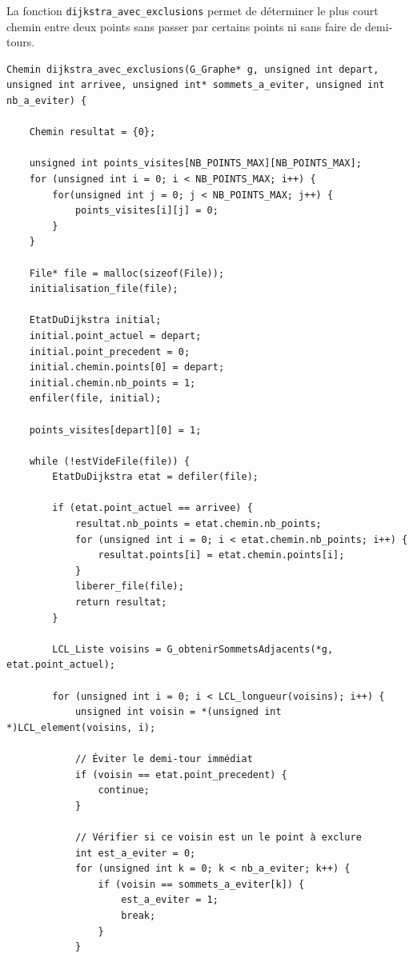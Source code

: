 \documentclass[11pt,a4paper]{article}
\begin{document}
La fonction \texttt{dijkstra\_avec\_exclusions} permet de déterminer le plus court chemin entre deux points sans passer par certains points ni sans faire de demi-tours.

\begin{lstlisting}[caption={Fonction dijkstra avec exclusions}, label=lst:dijkstra]
Chemin dijkstra_avec_exclusions(G_Graphe* g, unsigned int depart, unsigned int arrivee, unsigned int* sommets_a_eviter, unsigned int nb_a_eviter) {
    
    Chemin resultat = {0};
    
    unsigned int points_visites[NB_POINTS_MAX][NB_POINTS_MAX];
    for (unsigned int i = 0; i < NB_POINTS_MAX; i++) {
        for(unsigned int j = 0; j < NB_POINTS_MAX; j++) {
            points_visites[i][j] = 0;
        }
    }

    File* file = malloc(sizeof(File));
    initialisation_file(file);

    EtatDuDijkstra initial;
    initial.point_actuel = depart;
    initial.point_precedent = 0;
    initial.chemin.points[0] = depart;
    initial.chemin.nb_points = 1;
    enfiler(file, initial);
    
    points_visites[depart][0] = 1;

    while (!estVideFile(file)) {
        EtatDuDijkstra etat = defiler(file);
        
        if (etat.point_actuel == arrivee) {
            resultat.nb_points = etat.chemin.nb_points;
            for (unsigned int i = 0; i < etat.chemin.nb_points; i++) {
                resultat.points[i] = etat.chemin.points[i];
            }
            liberer_file(file);
            return resultat;
        }
        
        LCL_Liste voisins = G_obtenirSommetsAdjacents(*g, etat.point_actuel);
        
        for (unsigned int i = 0; i < LCL_longueur(voisins); i++) {
            unsigned int voisin = *(unsigned int *)LCL_element(voisins, i);
            
            // Éviter le demi-tour immédiat
            if (voisin == etat.point_precedent) {
                continue;
            }
            
            // Vérifier si ce voisin est un le point à exclure
            int est_a_eviter = 0;
            for (unsigned int k = 0; k < nb_a_eviter; k++) {
                if (voisin == sommets_a_eviter[k]) {
                    est_a_eviter = 1;
                    break;
                }
            }
            

\end{lstlisting}
\end{document}
